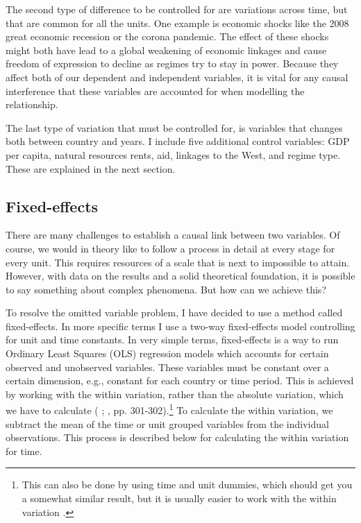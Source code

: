 The second type of difference to be controlled for are variations across time, but that are common for all the units. One example is economic shocks like the 2008 great economic recession or the corona pandemic. The effect of these shocks might both have lead to a global weakening of economic linkages and cause freedom of expression to decline as regimes try to stay in power. Because they affect both of our dependent and independent variables, it is vital for any causal interference that these variables are accounted for when modelling the relationship.

The last type of variation that must be controlled for, is variables that changes both between country and years. I include five additional control variables: GDP per capita, natural resources rents, aid, linkages to the West, and regime type. These are explained in the next section.

\subsection{Fixed-effects}
There are many challenges to establish a causal link between two variables. Of course, we would in theory like to follow a process in detail at every stage for every unit. This requires resources of a scale that is next to impossible to attain. However, with data on the results and a solid theoretical foundation, it is possible to say something about complex phenomena. But how can we achieve this?

To resolve the omitted variable problem, I have decided to use a method called fixed-effects. In more specific terms I use a two-way fixed-effects model controlling for unit and time constants. In very simple terms, fixed-effects is a way to run Ordinary Least Squares (OLS) regression models which accounts for certain observed and unobserved variables. These variables must be constant over a certain dimension, e.g., constant for each country or time period. This is achieved by working with the within variation, rather than the absolute variation, which we have to calculate (\citeauthor{huntington-klein_effect_2022} \citeyear{huntington-klein_effect_2022}; \citeauthor{wooldridge_econometric_2010} \citeyear{wooldridge_econometric_2010}, pp. 301-302).\footnote{This can also be done by using time and unit dummies, which should get you a somewhat similar result, but it is usually easier to work with the within variation \citep{huntington-klein_effect_2022}.} To calculate the within variation, we subtract the mean of the time or unit grouped variables from the individual observations. This process is described below for calculating the within variation for time. 

